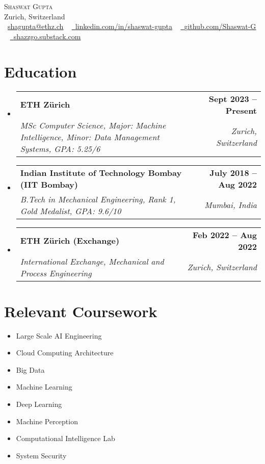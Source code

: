 \documentclass[letterpaper,10pt]{article}
\makeatletter
\newcommand{\resumeSubheading}[4]{
  \vspace{-2pt}\item
    \begin{tabular*}{1.0\textwidth}[t]{l@{\extracolsep{\fill}}r}
      \textbf{#1} & \textbf{\small #2} \\
      \textit{\small#3} & \textit{\small #4} \\
    \end{tabular*}\vspace{-7pt}
}
\newcommand{\resumeSubHeadingListStart}{\begin{itemize}[leftmargin=0.0in, label={}]}
\newcommand{\resumeSubHeadingListEnd}{\end{itemize}}
\makeatother
\begin{document}
\begin{center}
    {\Huge \scshape Shaswat Gupta} \\ \vspace{1pt}
    Zurich, Switzerland \\ \vspace{1pt}
    \small \raisebox{-0.1\height}\faEnvelope\ \href{mailto:shagupta@ethz.ch}{\underline{shagupta@ethz.ch}} ~ 
    \href{https://linkedin.com/in/shaswat-gupta/}{\raisebox{-0.2\height}\faLinkedin\ \underline{linkedin.com/in/shaswat-gupta}}  ~
    \href{https://github.com/Shaswat-G}{\raisebox{-0.2\height}\faGithub\ \underline{github.com/Shaswat-G}} ~
    \href{https://shazzgo.substack.com/}{\raisebox{-0.2\height}\faNewspaper\ \underline{shazzgo.substack.com}}
    \vspace{-8pt}
\end{center}

\section{Education}
  \resumeSubHeadingListStart
    \resumeSubheading
      {ETH Zürich}{Sept 2023 -- Present}
      {MSc Computer Science, Major: Machine Intelligence, Minor: Data Management Systems, GPA: 5.25/6}{Zurich, Switzerland}
    \resumeSubheading
      {Indian Institute of Technology Bombay (IIT Bombay)}{July 2018 -- Aug 2022}
      {B.Tech in Mechanical Engineering, Rank 1, Gold Medalist, GPA: 9.6/10}{Mumbai, India}
    \resumeSubheading
      {ETH Zürich (Exchange)}{Feb 2022 -- Aug 2022}
      {International Exchange, Mechanical and Process Engineering}{Zurich, Switzerland}
  \resumeSubHeadingListEnd

\section{Relevant Coursework}
    \begin{multicols}{4}
        \begin{itemize}[itemsep=-5pt, parsep=3pt]
            \item\small Large Scale AI Engineering
            \item Cloud Computing Architecture
            \item Big Data
            \item Machine Learning
            \item Deep Learning
            \item Machine Perception
            \item Computational Intelligence Lab
            \item System Security
        \end{itemize}
    \end{multicols}
    \vspace*{2.0\multicolsep}
\end{document}
